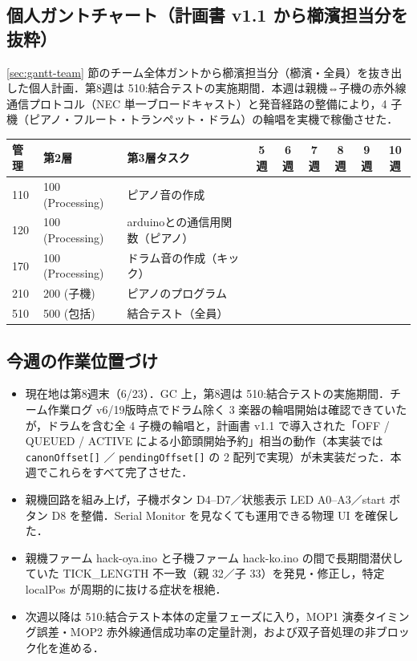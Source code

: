 \documentclass[a4paper,11pt]{ltjsarticle}
\providecommand{\％}{\%}
\begin{document}
\endgroup

\subsection{個人ガントチャート（計画書 v1.1 から櫛濱担当分を抜粋）}\label{sec:gantt-personal}

\ref{sec:gantt-team} 節のチーム全体ガントから櫛濱担当分（櫛濱・全員）を抜き出した個人計画．第8週は 510:結合テストの実施期間．本週は親機⇔子機の赤外線通信プロトコル（NEC 単一ブロードキャスト）と発音経路の整備により，4 子機（ピアノ・フルート・トランペット・ドラム）の輪唱を実機で稼働させた．

\begingroup
\setlength{\tabcolsep}{3pt}
\begin{longtable}{|p{0.9cm}|p{2.0cm}|p{5.2cm}|c|c|c|c|c|c|}
\hline
\rowcolor[gray]{0.9}
管理 & 第2層 & 第3層タスク & 5週 & 6週 & 7週 & 8週 & 9週 & 10週 \\
\hline
110 & 100 (Processing) & ピアノ音の作成 & \cellcolor{ganttCell} & & \cellcolor{ganttCell} & & & \\
\hline
120 & 100 (Processing) & arduinoとの通信用関数（ピアノ） & \cellcolor{ganttCell} & & & & & \\
\hline
170 & 100 (Processing) & ドラム音の作成（キック） & & \cellcolor{ganttCell} & & & & \\
\hline
210 & 200 (子機) & ピアノのプログラム & \cellcolor{ganttCell} & & & & & \\
\hline
510 & 500 (包括) & 結合テスト（全員） & & & & \cellcolor{ganttCell} & \cellcolor{ganttCell} & \cellcolor{ganttCell} \\
\hline
\end{longtable}
\endgroup

\subsection{今週の作業位置づけ}\label{sec:gantt-position}

\begin{itemize}
    \item 現在地は第8週末（6/23）．GC 上，第8週は 510:結合テストの実施期間．チーム作業ログ v6/19版時点でドラム除く 3 楽器の輪唱開始は確認できていたが，ドラムを含む全 4 子機の輪唱と，計画書 v1.1 で導入された「OFF / QUEUED / ACTIVE による小節頭開始予約」相当の動作（本実装では \texttt{canonOffset[]} ／ \texttt{pendingOffset[]} の 2 配列で実現）が未実装だった．本週でこれらをすべて完了させた．
    \item 親機回路を組み上げ，子機ボタン D4--D7／状態表示 LED A0--A3／start ボタン D8 を整備．Serial Monitor を見なくても運用できる物理 UI を確保した．
    \item 親機ファーム hack-oya.ino と子機ファーム hack-ko.ino の間で長期間潜伏していた TICK\_LENGTH 不一致（親 32／子 33）を発見・修正し，特定 localPos が周期的に抜ける症状を根絶．
    \item 次週以降は 510:結合テスト本体の定量フェーズに入り，MOP1 演奏タイミング誤差・MOP2 赤外線通信成功率の定量計測，および双子音処理の非ブロック化を進める．
\end{itemize}
\end{document}
